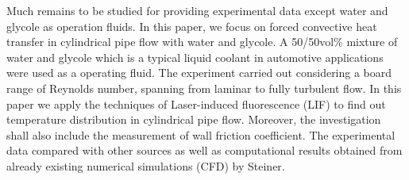 \documentclass[conference]{IEEEtran}
\begin{document}
Much remains to be studied for providing experimental data except water and glycole as operation fluids.
In this paper, we focus on forced convective heat transfer in cylindrical pipe flow with water and glycole.
A 50/50vol\% mixture of water and glycole which is a typical liquid coolant in automotive applications were used as a operating fluid.
The experiment carried out considering a board range of Reynolds number, spanning from laminar to fully turbulent flow.
In this paper we apply the techniques of Laser-induced fluorescence (LIF) to find out temperature distribution in cylindrical pipe flow.
Moreover, the investigation shall also include the measurement of wall friction coefficient.
The experimental data compared with other sources as well as computational results obtained from already existing numerical simulations (CFD) by Steiner\cite{Steiner2018}.

\end{document}
